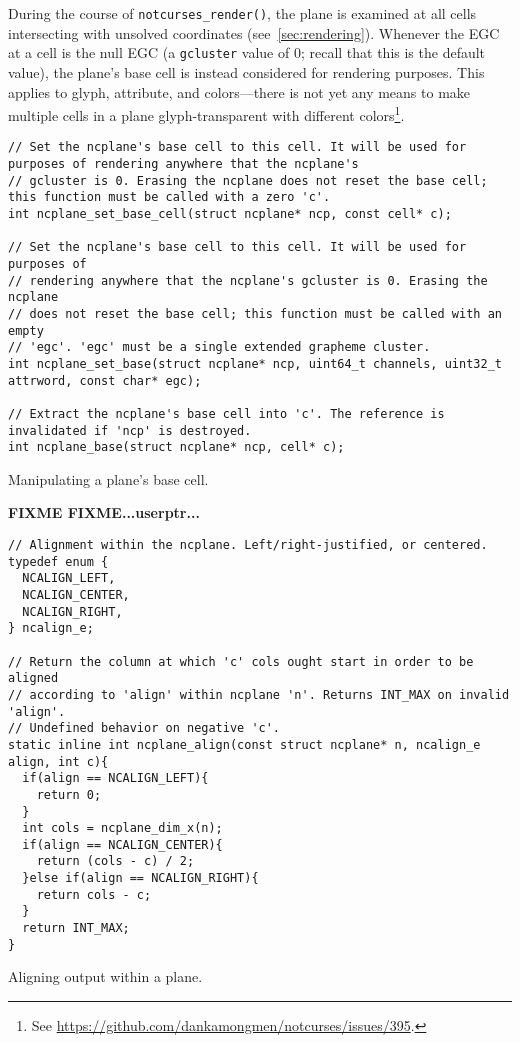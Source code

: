 During the course of \texttt{notcurses\_render()}, the plane is examined at
all cells intersecting with unsolved coordinates (see~\ref{sec:rendering}).
Whenever the EGC at a cell is the null EGC (a \texttt{gcluster} value of 0;
recall that this is the default value), the plane's base cell is instead
considered for rendering purposes. This applies to glyph, attribute, and
colors---there is not yet any means to make multiple cells in a plane glyph-transparent
with different colors\footnote{See \url{https://github.com/dankamongmen/notcurses/issues/395}.}.

\begin{listing}[!htb]
\begin{verbatim}
// Set the ncplane's base cell to this cell. It will be used for purposes of rendering anywhere that the ncplane's
// gcluster is 0. Erasing the ncplane does not reset the base cell; this function must be called with a zero 'c'.
int ncplane_set_base_cell(struct ncplane* ncp, const cell* c);

// Set the ncplane's base cell to this cell. It will be used for purposes of
// rendering anywhere that the ncplane's gcluster is 0. Erasing the ncplane
// does not reset the base cell; this function must be called with an empty
// 'egc'. 'egc' must be a single extended grapheme cluster.
int ncplane_set_base(struct ncplane* ncp, uint64_t channels, uint32_t attrword, const char* egc);

// Extract the ncplane's base cell into 'c'. The reference is invalidated if 'ncp' is destroyed.
int ncplane_base(struct ncplane* ncp, cell* c);
\end{verbatim}
\caption{Manipulating a plane's base cell.}
\end{listing}

\textbf{FIXME FIXME...userptr...}

\begin{listing}[!htb]
\begin{verbatim}
// Alignment within the ncplane. Left/right-justified, or centered.
typedef enum {
  NCALIGN_LEFT,
  NCALIGN_CENTER,
  NCALIGN_RIGHT,
} ncalign_e;

// Return the column at which 'c' cols ought start in order to be aligned
// according to 'align' within ncplane 'n'. Returns INT_MAX on invalid 'align'.
// Undefined behavior on negative 'c'.
static inline int ncplane_align(const struct ncplane* n, ncalign_e align, int c){
  if(align == NCALIGN_LEFT){
    return 0;
  }
  int cols = ncplane_dim_x(n);
  if(align == NCALIGN_CENTER){
    return (cols - c) / 2;
  }else if(align == NCALIGN_RIGHT){
    return cols - c;
  }
  return INT_MAX;
}
\end{verbatim}
\caption{Aligning output within a plane.}
\end{listing}

